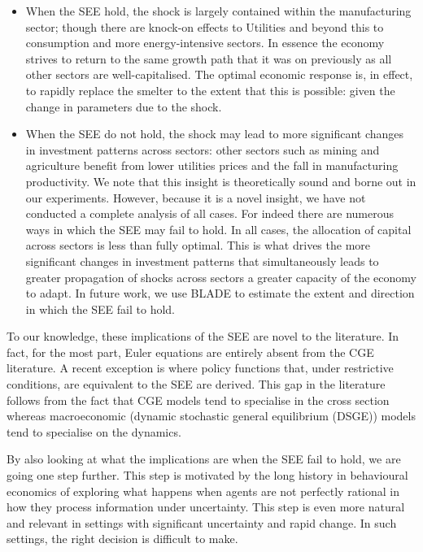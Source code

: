 \documentclass[12pt,a4paper]{article}
\begin{document}
\begin{itemize}
    
  \item When the SEE hold, the shock is largely contained within the
    manufacturing sector; though there are knock-on effects to Utilities and
    beyond this to consumption and more energy-intensive sectors. In essence
    the economy strives to return to the same growth path that it was on
    previously as all other sectors are well-capitalised. The optimal economic
    response is, in effect, to rapidly replace the smelter to the extent that
    this is possible: given the change in parameters due to the shock.

  \item When the SEE do not hold, the shock may lead to more significant
    changes in investment patterns across sectors: other sectors such as mining
    and agriculture benefit from lower utilities prices and the fall in
    manufacturing productivity.  We note that this insight is theoretically
    sound and borne out in our experiments. However, because it is a novel
    insight, we have not conducted a complete analysis of all cases. For indeed
    there are numerous ways in which the SEE may fail to hold. In all cases,
    the allocation of capital across sectors is less than fully optimal. This
    is what drives the more significant changes in investment patterns that
    simultaneously leads to greater propagation of shocks across sectors a
    greater capacity of the economy to adapt. In future work, we use BLADE to
    estimate the extent and direction in which the SEE fail to hold.

\end{itemize}

To our knowledge, these implications of the SEE are novel to the literature.
In fact, for the most part, Euler equations are entirely absent from the CGE
literature.  A recent exception is \cite{Dixon_Rimmer-Euler} where policy
functions that, under restrictive conditions, are equivalent to the SEE are
derived.  This gap in the literature follows from the fact that CGE models tend
to specialise in the cross section whereas macroeconomic (dynamic stochastic
general equilibrium (DSGE)) models tend to specialise on the dynamics.

By also looking at what the implications are when the SEE fail to
hold, we are going one step further. This step is motivated by the long history
in behavioural economics of exploring what happens when agents are not
perfectly rational in how they process information under uncertainty.  This
step is even more natural and relevant in settings with significant uncertainty
and rapid change. In such settings, the right decision is difficult to make.
\end{document}
